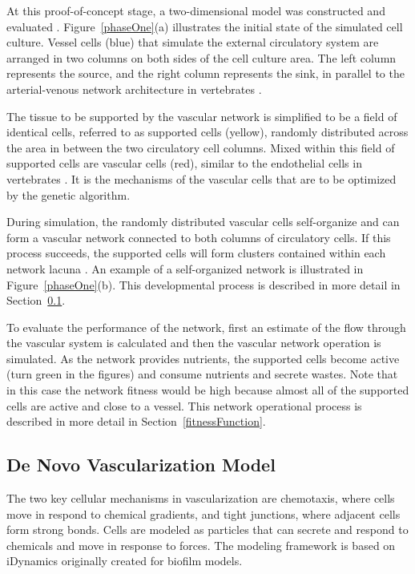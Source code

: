 \label{vascularModel}



At this proof-of-concept stage, a two-dimensional model was constructed and evaluated
. Figure~\ref{phaseOne}(a) illustrates the initial state of the simulated cell
culture. Vessel cells (blue) that simulate the external circulatory system are
arranged in two columns on both sides of the cell culture area. The left column
represents the source, and the right column represents the sink, in parallel to the
arterial-venous network architecture in vertebrates
\cite{delindavis:arterialvenoussystems}.

The tissue to be supported by the vascular network is simplified to be a field of
identical cells, referred to as supported cells (yellow), randomly distributed across
the area in between the two circulatory cell columns. Mixed within this field of
supported cells are vascular cells (red), similar to the endothelial cells in
vertebrates \cite{delindavis:Merks2008ContactInhibited}. It is the mechanisms of the
vascular cells that are to be optimized by the genetic algorithm.

During simulation, the randomly distributed vascular cells self-organize and can form
a vascular network connected to both columns of circulatory cells. If this process
succeeds, the supported cells will form clusters contained within each network lacuna
. An example of a self-organized network is illustrated in Figure~\ref{phaseOne}(b).
This developmental process is described in more detail in
Section~\ref{vesselDevelopment}.

To evaluate the performance of the network, first an estimate of the flow through the
vascular system is calculated and then the vascular network operation is simulated.
As the network provides nutrients, the supported cells become active (turn green in
the figures) and consume nutrients and secrete wastes. Note that in this case the
network fitness would be high because almost all of the supported cells are active
and close to a vessel. This network operational process is described in more detail
in Section~\ref{fitnessFunction}.

\subsection{De Novo Vascularization Model}
\label{vesselDevelopment}

The two key cellular mechanisms in vascularization are chemotaxis, where cells move
in respond to chemical gradients, and tight junctions, where adjacent cells form
strong bonds. Cells are modeled as particles that can secrete and respond to
chemicals and move in response to forces. The modeling framework is based on
iDynamics \cite{Lardon2011IDynoMiCS} originally created for biofilm models.

